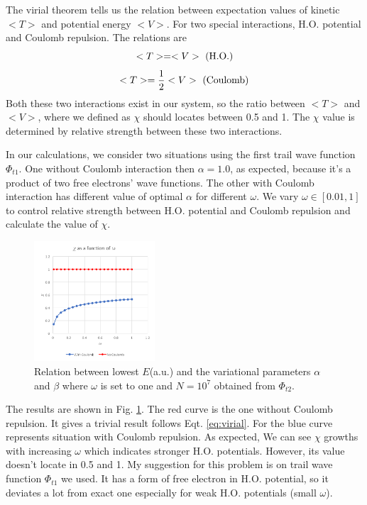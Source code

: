 The virial theorem tells us the relation between expectation values of kinetic $<T>$ and potential energy $<V>$.
For two special interactions, H.O. potential and Coulomb repulsion.
The relations are
\begin{equation}\label{eq:virial}
	<T>=<V>\ (\rm{H.O.})
\end{equation}
\begin{equation}
	<T>=\frac{1}{2}<V>\ (\rm{Coulomb})
\end{equation}
Both these two interactions exist in our system, so the ratio between $<T>$ and $<V>$, where we defined as $\chi$ should locates between 0.5 and 1.
The $\chi$ value is determined by relative strength between these two interactions.

In our calculations, we consider two situations using 
the first trail wave function $\Phi_{t1}$.
One without Coulomb interaction then $\alpha=1.0$, as expected, because it's a product of two free electrons' wave functions.
The other with Coulomb interaction has different value of optimal $\alpha$ for different  $\omega$. 
We vary $\omega \in [0.01,1]$ to control relative strength between H.O. potential and Coulomb repulsion and calculate the value of $\chi$.
\begin{figure}[tb]
\label{fig:virial}
\centering
\includegraphics[width=0.4\textwidth]{virial.png}
\caption{Relation between lowest $E$(a.u.) and the variational parameters $\alpha$ and $\beta$ where $\omega$ is set to one and $N=10^7$ obtained from $\Phi_{t2}$.}
\end{figure}
The results are shown in Fig. \ref{fig:virial}.
The red curve is the one without Coulomb repulsion.
It gives a trivial result follows Eqt. \ref{eq:virial}.
For the blue curve represents situation with Coulomb repulsion.
As expected, We can see $\chi$ growths with increasing $\omega$ which indicates stronger H.O. potentials.
However, its value doesn't locate in 0.5 and 1. 
My suggestion for this problem is on trail wave function $\Phi_{t1}$ we used.
It has a form of free electron in H.O. potential, so it deviates a lot from exact one especially for weak H.O. potentials (small $\omega$).
